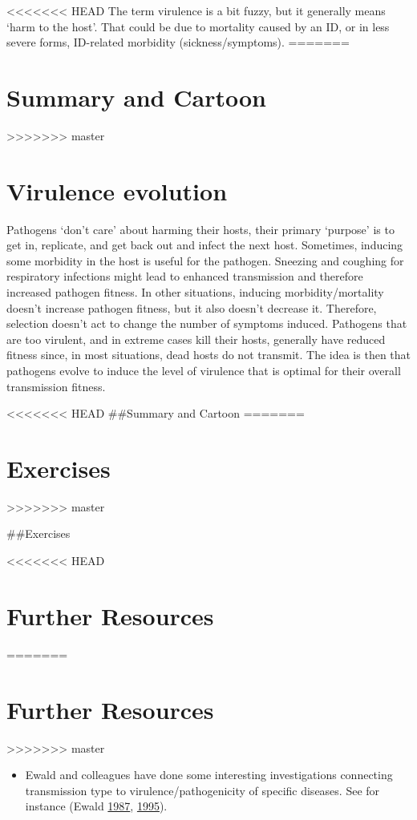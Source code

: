 \documentclass[]{book}
\providecommand{\tightlist}{%
  \setlength{\itemsep}{0pt}\setlength{\parskip}{0pt}}
\theoremstyle{definition}
\theoremstyle{definition}
\theoremstyle{definition}
\theoremstyle{remark}
\begin{document}
<<<<<<< HEAD
The term virulence is a bit fuzzy, but it generally means `harm to the
host'. That could be due to mortality caused by an ID, or in less severe
forms, ID-related morbidity (sickness/symptoms).
=======
\section{Summary and Cartoon}\label{summary-and-cartoon-15}
>>>>>>> master

\hypertarget{virulence-evolution}{%
\section{Virulence evolution}\label{virulence-evolution}}

Pathogens `don't care' about harming their hosts, their primary
`purpose' is to get in, replicate, and get back out and infect the next
host. Sometimes, inducing some morbidity in the host is useful for the
pathogen. Sneezing and coughing for respiratory infections might lead to
enhanced transmission and therefore increased pathogen fitness. In other
situations, inducing morbidity/mortality doesn't increase pathogen
fitness, but it also doesn't decrease it. Therefore, selection doesn't
act to change the number of symptoms induced. Pathogens that are too
virulent, and in extreme cases kill their hosts, generally have reduced
fitness since, in most situations, dead hosts do not transmit. The idea
is then that pathogens evolve to induce the level of virulence that is
optimal for their overall transmission fitness.

<<<<<<< HEAD
\#\#Summary and Cartoon
=======
\section{Exercises}\label{exercises-15}
>>>>>>> master

\#\#Exercises

<<<<<<< HEAD
\hypertarget{further-resources-10}{%
\section{Further Resources}\label{further-resources-10}}
=======
\section{Further Resources}\label{further-resources-15}
>>>>>>> master

\begin{itemize}
\tightlist
\item
  Ewald and colleagues have done some interesting investigations
  connecting transmission type to virulence/pathogenicity of specific
  diseases. See for instance (Ewald
  \protect\hyperlink{ref-ewald87}{1987},
  \protect\hyperlink{ref-ewald95}{1995}).
\end{itemize}
\end{document}
